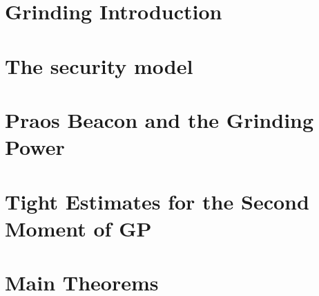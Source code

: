 \chapter{Grinding Introduction }\label{ch:grinding-intro}


\chapter{The security model}\label{sec:model-grinding}


% 

\chapter{Praos Beacon and the Grinding Power}\label{sec:praos}



% 


\chapter{Tight Estimates for the Second Moment of GP}\label{sec:praos-second-moment}



\chapter{Main Theorems}\label{sec:praos-main-theorems}



% 


% 


